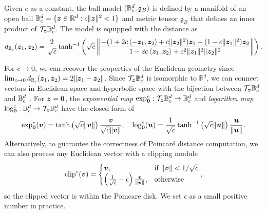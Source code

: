 \begin{definition} Given $c$ as a constant, the \Poincare ball model $({\mathbb{B}}_c^d,\mathfrak{g}_B)$ is defined by a manifold of an open ball ${\mathbb{B}}_c^d=\{{\bm{z}}\in{\mathbb{R}}^d:c\|{\bm{z}}\|^2< 1\}$ and metric tensor $\mathfrak{g}_B$ that defines an inner product of ${\mathcal{T}}_{\bm{z}} {\mathbb{B}}_c^d$. The model is equipped with the distance \citep{ungar2001hyperbolic} as
\begin{equation}
d_{{\mathbb{B}}_c}({\bm{z}}_1,{\bm{z}}_2) = \frac{2}{\sqrt{c}}\tanh^{-1}\left(\sqrt{c}\left\lVert\frac{-(1 + 2c\left<-{\bm{z}}_1, {\bm{z}}_2\right> + c\|{\bm{z}}_2\|^2){\bm{z}}_1 + (1 - c\|{\bm{z}}_1\|^2){\bm{z}}_2}{1 - 2c\left<{\bm{z}}_1,{\bm{z}}_2\right> + c^2\|{\bm{z}}_1\|^2\|{\bm{z}}_2\|^2}\right\rVert\right).
\label{eq:poincaredistance}
\end{equation}
\end{definition}
For $c \to 0$, we can recover the properties of the Euclidean geometry since $\lim_{c \to 0} d_{{\mathbb{B}}_c}({\bm{z}}_1,{\bm{z}}_2) = 2\|{\bm{z}}_1-{\bm{z}}_2\|$. Since ${\mathcal{T}}_{\bm{z}} {\mathbb{B}}_c^d$ is isomorphic to $\mathbb{R}^d$, we can connect vectors in Euclidean space and hyperbolic space with the bijection between ${\mathcal{T}}_{\bm{z}} {\mathbb{B}}_c^d$ and ${\mathbb{B}}_c^d$ \citep{ungar2001hyperbolic}. For ${\bm{z}} = \mathbf{0}$, the \emph{exponential map} $\exp_\mathbf{0}^c : {\mathcal{T}}_{\bm{z}} {\mathbb{B}}_c^d \to {\mathbb{B}}_c^d$ and \emph{logarithm map} $\log_\mathbf{0}^c : {\mathbb{B}}_c^d \to {\mathcal{T}}_{\bm{z}} {\mathbb{B}}_c^d$ have the closed form of
\begin{equation}
\label{eq:hyp_maps}
    \exp_\mathbf{0}^c ({\bm{v}}) = \tanh\left(\sqrt{c} \|{\bm{v}}\| \right)\frac{{\bm{v}}}{\sqrt{c}\|{\bm{v}}\|}, \quad \log_\mathbf{0}^c ({\bm{u}}) = \frac{1}{\sqrt{c}}\tanh^{-1}\left(\sqrt{c} \| {\bm{u}} \| \right)\frac{{\bm{u}}}{\|{\bm{u}} \|}. 
\end{equation}
Alternatively, to guarantee the correctness of Poincaré distance computation, we can also process any Euclidean vector with a clipping module \citep{nickel2017poincare}
\begin{equation}
    \text{clip}^c({\bm{v}}) = \begin{cases}
			{\bm{v}}, & \text{if $\|{\bm{v}}\|< 1 / \sqrt{c}$}\\
                \left(\frac{1}{\sqrt{c}} - \epsilon\right) \frac{{\bm{v}}}{\|{\bm{v}}\|} , & \text{otherwise}
		 \end{cases},
\end{equation}
so the clipped vector is within the Poincare disk. We set $\epsilon$ as a small positive number in practice.

